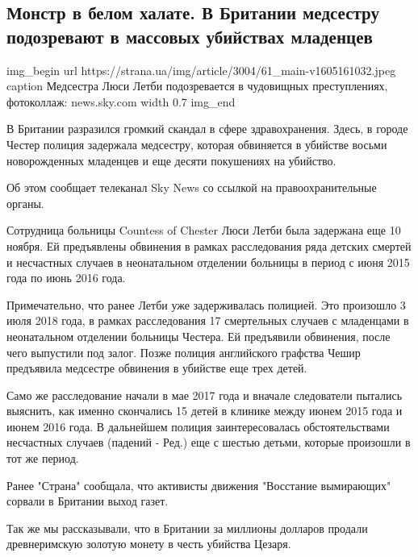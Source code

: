  
 
 

\subsection{Монстр в белом халате. В Британии медсестру подозревают в массовых убийствах младенцев}

\ifcmt
img_begin 
	url https://strana.ua/img/article/3004/61_main-v1605161032.jpeg
	caption Медсестра Люси Летби подозревается в чудовищных преступлениях, фотоколлаж: news.sky.com 
	width 0.7
img_end
\fi

В Британии разразился громкий скандал в сфере здравохранения. Здесь, в городе
Честер полиция задержала медсестру, которая обвиняется в убийстве восьми
новорожденных младенцев и еще десяти покушениях на убийство.

Об этом сообщает телеканал Sky News со ссылкой на правоохранительные органы.

Сотрудница больницы Countess of Chester Люси Летби была задержана еще 10
ноября. Ей предъявлены обвинения в рамках расследования ряда детских смертей и
несчастных случаев в неонатальном отделении больницы в период с июня 2015 года
по июнь 2016 года.

Примечательно, что ранее Летби уже задерживалась полицией. Это произошло 3 июля
2018 года, в рамках расследования 17 смертельных случаев с младенцами в
неонатальном отделении больницы Честера. Ей предъявили обвинения, после чего
выпустили под залог. Позже полиция английского графства Чешир предъявила
медсестре обвинения в убийстве еще трех детей.

Само же расследование начали в мае 2017 года и вначале следователи пытались
выяснить, как именно скончались 15 детей в клинике между июнем 2015 года и
июнем 2016 года. В дальнейшем полиция заинтересовалась обстоятельствами
несчастных случаев (падений - Ред.) еще с шестью детьми, которые произошли в
тот же период.

Ранее "Страна" сообщала, что активисты движения "Восстание вымирающих" сорвали
в Британии выход газет.

Так же мы рассказывали, что в Британии за миллионы долларов продали
древнеримскую золотую монету в честь убийства Цезаря.

